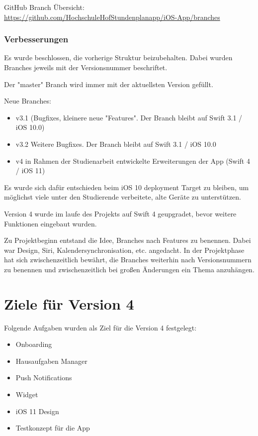 GitHub Branch Übersicht:\\
 \url{https://github.com/HochschuleHofStundenplanapp/iOS-App/branches}

\subsubsection{Verbesserungen}
Es wurde beschlossen, die vorherige Struktur beizubehalten. Dabei wurden Branches jeweils mit der Versionsnummer beschriftet.

Der "master" Branch wird immer mit der aktuellsten Version gefüllt.

Neue Branches:
\begin{itemize}
\item v3.1 (Bugfixes, kleinere neue "Features". Der Branch bleibt auf Swift 3.1  / iOS 10.0)
\item v3.2 Weitere Bugfixes. Der Branch bleibt auf Swift 3.1  / iOS 10.0 %
\item v4 in Rahmen der Studienarbeit entwickelte Erweiterungen der App (Swift 4 / iOS 11)
\end{itemize}




Es wurde sich dafür entschieden beim iOS 10 deployment Target zu bleiben, um möglichst viele unter den Studierende verbeitete, alte Geräte zu unterstützen.

Version 4 wurde im laufe des Projekts auf Swift 4 geupgradet, bevor weitere Funktionen eingebaut wurden.

Zu Projektbeginn entstand die Idee, Branches nach Features zu benennen. Dabei war Design, Siri, Kalendersynchronisation, etc. angedacht. In der Projektphase hat sich zwischenzeitlich bewährt, die Branches weiterhin nach Versionsnummern zu benennen und zwischenzeitlich bei großen Änderungen ein Thema anzuhängen.




\section{Ziele für Version 4}
Folgende Aufgaben wurden als Ziel für die Version 4 festgelegt:
\begin{itemize}
\item Onboarding
\item Hausaufgaben Manager
\item Push Notifications
\item Widget
\item iOS 11 Design
\item Testkonzept für die App
\end{itemize}



